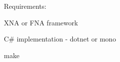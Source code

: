 Requirements\+:
\begin{DoxyItemize}
\item XNA or FNA framework
\item C\# implementation -\/ dotnet or mono
\item make 
\end{DoxyItemize}